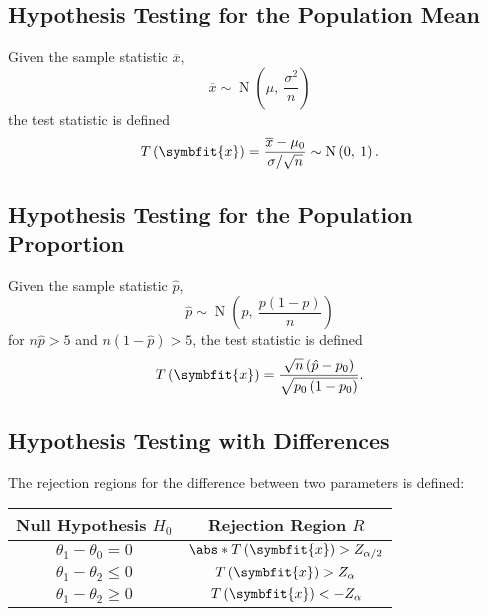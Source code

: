 \documentclass{article}
\begin{document}
\begin{multicols}{3}
\subsection{Hypothesis Testing for the Population Mean}
Given the sample statistic \(\overline{x}\),
\begin{equation*}
    \overline{x} \sim \operatorname{N}\left( \mu,\: \frac{\sigma^2}{n} \right)
\end{equation*}
the test statistic is defined
\begin{equation*}
    T\left( \symbfit{x} \right) = \frac{\overline{x} - \mu_0}{\sigma/\sqrt{n}} \sim \operatorname{N}\left( 0,\: 1 \right).
\end{equation*}
\subsection{Hypothesis Testing for the Population Proportion}
Given the sample statistic \(\hat{p}\),
\begin{equation*}
    \hat{p} \sim \operatorname{N}\left( p,\: \frac{p\left( 1 - p \right)}{n} \right)
\end{equation*}
for \(n \hat{p} > 5\) and \(n \left( 1 - \hat{p} \right) > 5\),
the test statistic is defined
\begin{equation*}
    T\left( \symbfit{x} \right) = \frac{\sqrt{n} \left( \hat{p} - p_0 \right)}{\sqrt{p_0 \left( 1 - p_0 \right)}}.
\end{equation*}
\subsection{Hypothesis Testing with Differences}
The rejection regions for the difference between two parameters is defined:
\begin{center}
    \begin{tabular}{cc}
        \toprule
        \textbf{Null Hypothesis} \(H_0\) & \textbf{Rejection Region} \(R\)                       \\
        \midrule
        \(\theta_1 - \theta_0 = 0\)      & \(\abs*{T\left( \symbfit{x} \right)} > Z_{\alpha/2}\) \\
        \(\theta_1 - \theta_2 \leq 0\)   & \(T\left( \symbfit{x} \right) > Z_{\alpha}\)          \\
        \(\theta_1 - \theta_2 \geq 0\)   & \(T\left( \symbfit{x} \right) < -Z_{\alpha}\)         \\
        \bottomrule
    \end{tabular}
\end{center}

\end{multicols}
\end{document}
